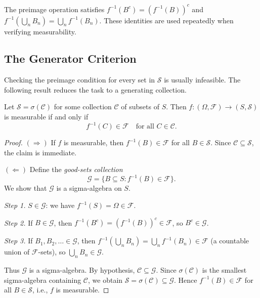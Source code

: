 \documentclass[11pt,a4paper]{article}
\begin{document}
\begin{remark}
The preimage operation satisfies $f^{-1}(B^c) = (f^{-1}(B))^c$ and
$f^{-1}(\bigcup_n B_n) = \bigcup_n f^{-1}(B_n)$. These identities are
used repeatedly when verifying measurability.
\end{remark}

\subsection{The Generator Criterion}
\label{subsec:generator_criterion}

Checking the preimage condition for every set in $\mathcal{S}$ is usually
infeasible. The following result reduces the task to a generating collection.

\begin{keyresult}[title={Generator Criterion}]
\begin{theorem}
\label{thm:generator_criterion}
Let $\mathcal{S} = \sigma(\mathcal{C})$ for some collection $\mathcal{C}$
of subsets of $S$. Then $f: (\Omega, \mathcal{F}) \to (S, \mathcal{S})$
is measurable if and only if
\begin{equation}
  f^{-1}(C) \in \mathcal{F} \quad \text{for all } C \in \mathcal{C}.
  \label{eq:generator_criterion}
\end{equation}
\end{theorem}
\end{keyresult}

\begin{proof}
$(\Rightarrow)$ If $f$ is measurable, then $f^{-1}(B) \in \mathcal{F}$ for
all $B \in \mathcal{S}$. Since $\mathcal{C} \subseteq \mathcal{S}$, the
claim is immediate.

$(\Leftarrow)$ Define the \emph{good-sets collection}
\begin{equation}
  \mathcal{G} = \{B \subseteq S : f^{-1}(B) \in \mathcal{F}\}.
  \label{eq:good_sets}
\end{equation}
We show that $\mathcal{G}$ is a sigma-algebra on $S$.

\textit{Step 1.} $S \in \mathcal{G}$: we have
$f^{-1}(S) = \Omega \in \mathcal{F}$.

\textit{Step 2.} If $B \in \mathcal{G}$, then
$f^{-1}(B^c) = (f^{-1}(B))^c \in \mathcal{F}$, so $B^c \in \mathcal{G}$.

\textit{Step 3.} If $B_1, B_2, \ldots \in \mathcal{G}$, then
$f^{-1}(\bigcup_n B_n) = \bigcup_n f^{-1}(B_n) \in \mathcal{F}$ (a
countable union of $\mathcal{F}$-sets), so
$\bigcup_n B_n \in \mathcal{G}$.

Thus $\mathcal{G}$ is a sigma-algebra. By hypothesis,
$\mathcal{C} \subseteq \mathcal{G}$. Since $\sigma(\mathcal{C})$ is the
smallest sigma-algebra containing $\mathcal{C}$, we obtain
$\mathcal{S} = \sigma(\mathcal{C}) \subseteq \mathcal{G}$. Hence
$f^{-1}(B) \in \mathcal{F}$ for all $B \in \mathcal{S}$, i.e., $f$ is
measurable.
\end{proof}
\end{document}
